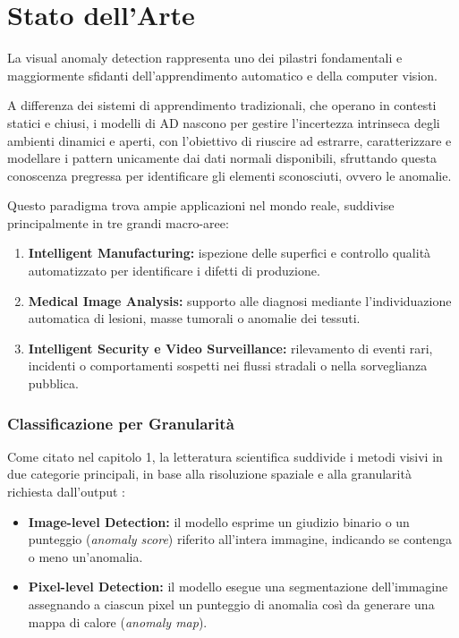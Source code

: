 \chapter{Stato dell'Arte}
La visual anomaly detection rappresenta uno dei pilastri fondamentali e maggiormente sfidanti dell'apprendimento automatico e della computer vision.

A differenza dei sistemi di apprendimento tradizionali, che operano in contesti statici e chiusi, i modelli di AD nascono per gestire l'incertezza intrinseca degli ambienti dinamici e aperti, con l'obiettivo di riuscire ad estrarre, caratterizzare e modellare i pattern unicamente dai dati normali disponibili, sfruttando questa conoscenza pregressa per identificare gli elementi sconosciuti, ovvero le anomalie.\cite{Yang_et_al._2021}\cite{Cui_et_al._2023}

Questo paradigma trova ampie applicazioni nel mondo reale, suddivise principalmente in tre grandi macro-aree\cite{Yang_et_al._2021}:
\begin{enumerate}
    \item \textbf{Intelligent Manufacturing:} ispezione delle superfici e controllo qualità automatizzato per identificare i difetti di produzione.
    \item \textbf{Medical Image Analysis:} supporto alle diagnosi mediante l'individuazione automatica di lesioni, masse tumorali o anomalie dei tessuti.
    \item \textbf{Intelligent Security e Video Surveillance:} rilevamento di eventi rari, incidenti o comportamenti sospetti nei flussi stradali o nella sorveglianza pubblica.
\end{enumerate}

\subsection{Classificazione per Granularità}
Come citato nel capitolo 1, la letteratura scientifica suddivide i metodi visivi in due categorie principali, in base alla risoluzione spaziale e alla granularità richiesta dall'output \cite{Yang_et_al._2021}:
\begin{itemize}
    \item \textbf{Image-level Detection:} il modello esprime un giudizio binario o un punteggio (\textit{anomaly score}) riferito all'intera immagine, indicando se contenga o meno un'anomalia.
    \item \textbf{Pixel-level Detection:} il modello esegue una segmentazione dell'immagine assegnando a ciascun pixel un punteggio di anomalia così da generare una mappa di calore (\textit{anomaly map}).
\end{itemize}

